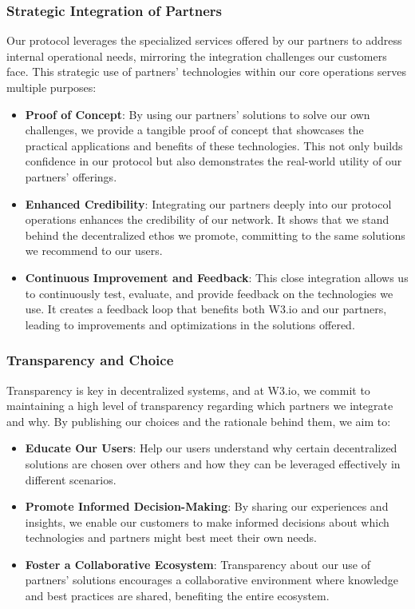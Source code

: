 \documentclass[11pt]{article}
\begin{document}
\subsubsection*{Strategic Integration of Partners}
Our protocol leverages the specialized services offered by our partners to address internal operational needs, mirroring the integration challenges our customers face. This strategic use of partners' technologies within our core operations serves multiple purposes:
\begin{itemize}
    \item \textbf{Proof of Concept}: By using our partners' solutions to solve our own challenges, we provide a tangible proof of concept that showcases the practical applications and benefits of these technologies. This not only builds confidence in our protocol but also demonstrates the real-world utility of our partners' offerings.
    \item \textbf{Enhanced Credibility}: Integrating our partners deeply into our protocol operations enhances the credibility of our network. It shows that we stand behind the decentralized ethos we promote, committing to the same solutions we recommend to our users.
    \item \textbf{Continuous Improvement and Feedback}: This close integration allows us to continuously test, evaluate, and provide feedback on the technologies we use. It creates a feedback loop that benefits both W3.io and our partners, leading to improvements and optimizations in the solutions offered.
\end{itemize}

\subsubsection*{Transparency and Choice}
Transparency is key in decentralized systems, and at W3.io, we commit to maintaining a high level of transparency regarding which partners we integrate and why. By publishing our choices and the rationale behind them, we aim to:
\begin{itemize}
    \item \textbf{Educate Our Users}: Help our users understand why certain decentralized solutions are chosen over others and how they can be leveraged effectively in different scenarios.
    \item \textbf{Promote Informed Decision-Making}: By sharing our experiences and insights, we enable our customers to make informed decisions about which technologies and partners might best meet their own needs.
    \item \textbf{Foster a Collaborative Ecosystem}: Transparency about our use of partners' solutions encourages a collaborative environment where knowledge and best practices are shared, benefiting the entire ecosystem.
\end{itemize}
\end{document}
